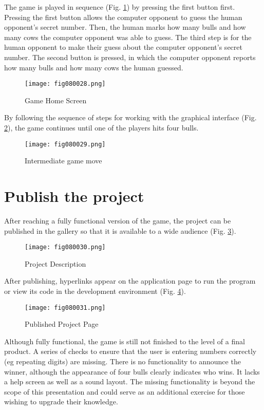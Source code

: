 The game is played in sequence (Fig. \ref{fig080028}) by pressing the first button first. Pressing the first button allows the computer opponent to guess the human opponent's secret number. Then, the human marks how many bulls and how many cows the computer opponent was able to guess. The third step is for the human opponent to make their guess about the computer opponent's secret number. The second button is pressed, in which the computer opponent reports how many bulls and how many cows the human guessed.

\begin{figure}[H]
   \centering
   \texttt{[image: fig080028.png]}
   \caption{Game Home Screen}
\label{fig080028}
\end{figure}

By following the sequence of steps for working with the graphical interface (Fig. \ref{fig080029}), the game continues until one of the players hits four bulls.

\begin{figure}[H]
   \centering
   \texttt{[image: fig080029.png]}
   \caption{Intermediate game move}
\label{fig080029}
\end{figure}

\section{Publish the project}

After reaching a fully functional version of the game, the project can be published in the gallery so that it is available to a wide audience (Fig. \ref{fig080030}).

\begin{figure}[H]
   \centering
   \texttt{[image: fig080030.png]}
   \caption{Project Description}
\label{fig080030}
\end{figure}

After publishing, hyperlinks appear on the application page to run the program or view its code in the development environment (Fig. \ref{fig080031}).

\begin{figure}[H]
   \centering
   \texttt{[image: fig080031.png]}
   \caption{Published Project Page}
\label{fig080031}
\end{figure}

Although fully functional, the game is still not finished to the level of a final product. A series of checks to ensure that the user is entering numbers correctly (eg repeating digits) are missing. There is no functionality to announce the winner, although the appearance of four bulls clearly indicates who wins. It lacks a help screen as well as a sound layout. The missing functionality is beyond the scope of this presentation and could serve as an additional exercise for those wishing to upgrade their knowledge.

